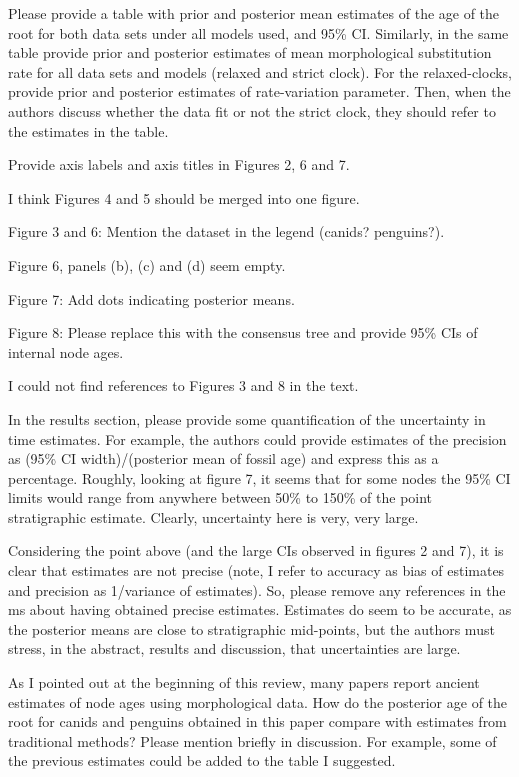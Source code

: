 \documentclass[11pt]{article}
\begin{document}
Please provide a table with prior and posterior mean estimates of the age of the root for both data sets under all models used, and 95\% CI. Similarly, in the same table provide prior and posterior estimates of mean morphological substitution rate for all data sets and models (relaxed and strict clock). For the relaxed-clocks, provide prior and posterior estimates of rate-variation parameter. Then, when the authors discuss whether the data fit or not the strict clock, they should refer to the estimates in the table.

Provide axis labels and axis titles in Figures 2, 6 and 7.

I think Figures 4 and 5 should be merged into one figure.

Figure 3 and 6: Mention the dataset in the legend (canids? penguins?).

Figure 6, panels (b), (c) and (d) seem empty.

Figure 7: Add dots indicating posterior means.

Figure 8: Please replace this with the consensus tree and provide 95\% CIs of internal node ages.

I could not find references to Figures 3 and 8 in the text.

In the results section, please provide some quantification of the uncertainty in time estimates. For example,  the authors could provide estimates of the precision as (95\% CI width)/(posterior mean of fossil age) and express this as a percentage. Roughly, looking at figure 7, it seems that for some nodes the 95\% CI limits would range from anywhere between 50\% to 150\% of the point stratigraphic estimate. Clearly, uncertainty here is very, very large. 

Considering the point above (and the large CIs observed in figures 2 and 7), it is clear that estimates are not precise (note, I refer to accuracy as bias of estimates and precision as 1/variance of estimates). So, please remove any references in the ms about having obtained precise estimates. Estimates do seem to be accurate, as the posterior means are close to stratigraphic mid-points, but the authors must stress, in the abstract, results and discussion, that uncertainties are large.

As I pointed out at the beginning of this review, many papers report ancient estimates of node ages using morphological data. How do the posterior age of the root for canids and penguins obtained in this paper compare with estimates from traditional methods? Please mention briefly in discussion. For example, some of the previous estimates could be added to the table I suggested.
\end{document}
